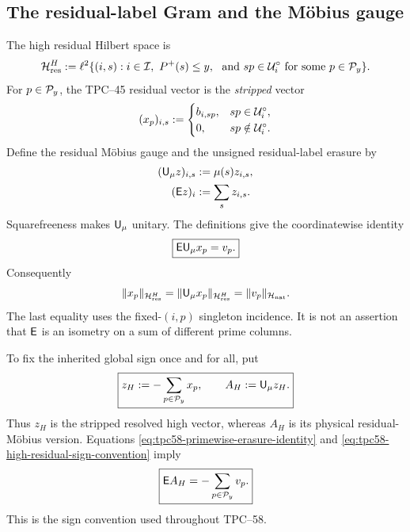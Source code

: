\subsection{The residual-label Gram and the M\"obius gauge}

The high residual Hilbert space is
\begin{equation}
 \mathcal H_{\rm res}^{H}
 :=\ell^2\{(i,s):i\in\mathcal I,\ P^+(s)\le y,\
                   \text{ and }sp\in\mathcal U_i^\circ
                   \text{ for some }p\in\mathcal P_y\}.
 \label{eq:tpc58-high-residual-space}
\end{equation}
For \(p\in\mathcal P_y\), the TPC--45 residual vector is the \emph{stripped}
vector
\begin{equation}
 (x_p)_{i,s}:=
 \begin{cases}
  b_{i,sp},&sp\in\mathcal U_i^\circ,\\
  0,&sp\notin\mathcal U_i^\circ.
 \end{cases}
 \label{eq:tpc58-stripped-residual-vector}
\end{equation}
Define the residual M\"obius gauge and the unsigned residual-label erasure
by
\begin{align}
 (\mathsf U_\mu z)_{i,s}&:=\mu(s)z_{i,s},
 \label{eq:tpc58-mobius-gauge}\\
 (\mathsf E z)_i&:=\sum_s z_{i,s}.
 \label{eq:tpc58-dictionary-unsigned-erasure}
\end{align}
Squarefreeness makes \(\mathsf U_\mu\) unitary.  The definitions give the
coordinatewise identity
\begin{equation}
 \boxed{\mathsf E\mathsf U_\mu x_p=v_p.}
 \label{eq:tpc58-primewise-erasure-identity}
\end{equation}
Consequently
\begin{equation}
 \|x_p\|_{\mathcal H_{\rm res}^{H}}
 =\|\mathsf U_\mu x_p\|_{\mathcal H_{\rm res}^{H}}
 =\|v_p\|_{\mathcal H_{\rm nat}}.
 \label{eq:tpc58-primewise-diagonal-equality}
\end{equation}
The last equality uses the fixed-\((i,p)\) singleton incidence.  It is not
an assertion that \(\mathsf E\) is an isometry on a sum of different prime
columns.

To fix the inherited global sign once and for all, put
\begin{equation}
 \boxed{
 z_H:=-\sum_{p\in\mathcal P_y}x_p,
 \qquad
 A_H:=\mathsf U_\mu z_H.}
 \label{eq:tpc58-high-residual-sign-convention}
\end{equation}
Thus \(z_H\) is the stripped resolved high vector, whereas \(A_H\) is its
physical residual-M\"obius version.  Equations
\eqref{eq:tpc58-primewise-erasure-identity} and
\eqref{eq:tpc58-high-residual-sign-convention} imply
\begin{equation}
 \boxed{
 \mathsf E A_H=-\sum_{p\in\mathcal P_y}v_p.}
 \label{eq:tpc58-high-native-erasure}
\end{equation}
This is the sign convention used throughout TPC--58.

